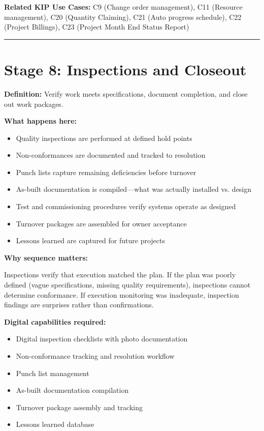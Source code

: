 \documentclass[11pt, letterpaper]{article}
\begin{document}
\textbf{Related KIP Use Cases:} C9 (Change order management), C11 (Resource management), C20 (Quantity Claiming), C21 (Auto progress schedule), C22 (Project Billings), C23 (Project Month End Status Report)

\vspace{1em}

\hrule

\vspace{1em}

\section*{Stage 8: Inspections and Closeout}

\textbf{Definition:} Verify work meets specifications, document completion, and close out work packages.

\textbf{What happens here:}
\begin{itemize}
    \item Quality inspections are performed at defined hold points
    \item Non-conformances are documented and tracked to resolution
    \item Punch lists capture remaining deficiencies before turnover
    \item As-built documentation is compiled---what was actually installed vs. design
    \item Test and commissioning procedures verify systems operate as designed
    \item Turnover packages are assembled for owner acceptance
    \item Lessons learned are captured for future projects
\end{itemize}

\textbf{Why sequence matters:}

Inspections verify that execution matched the plan. If the plan was poorly defined (vague specifications, missing quality requirements), inspections cannot determine conformance. If execution monitoring was inadequate, inspection findings are surprises rather than confirmations.

\textbf{Digital capabilities required:}
\begin{itemize}
    \item Digital inspection checklists with photo documentation
    \item Non-conformance tracking and resolution workflow
    \item Punch list management
    \item As-built documentation compilation
    \item Turnover package assembly and tracking
    \item Lessons learned database
\end{itemize}
\end{document}
